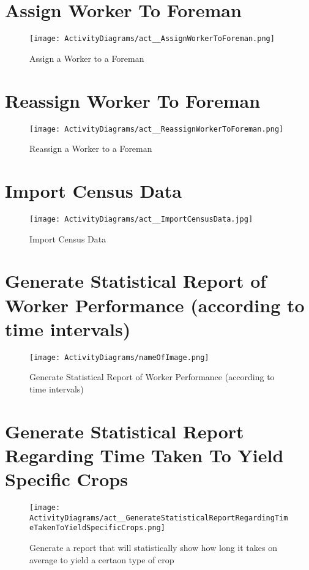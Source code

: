 \documentclass[11pt,fleqn]{book} %
\begin{document}
\section{Assign Worker To Foreman}
\begin{figure}
	\texttt{[image: ActivityDiagrams/act\_\_AssignWorkerToForeman.png]}
	\caption{Assign a Worker to a Foreman}
\end{figure}

\section{Reassign Worker To Foreman}
\begin{figure}
	\texttt{[image: ActivityDiagrams/act\_\_ReassignWorkerToForeman.png]}
	\caption{Reassign a Worker to a Foreman}
\end{figure}

\section{Import Census Data}
\begin{figure}
	\texttt{[image: ActivityDiagrams/act\_\_ImportCensusData.jpg]}
	\caption{Import Census Data}
\end{figure}

\section{Generate Statistical Report of Worker Performance (according to time intervals)}
\begin{figure}
	\texttt{[image: ActivityDiagrams/nameOfImage.png]}
	\caption{Generate Statistical Report of Worker Performance (according to time intervals)}
\end{figure}

\section{Generate Statistical Report Regarding Time Taken To Yield Specific Crops}
\begin{figure}
	\texttt{[image: ActivityDiagrams/act\_\_GenerateStatisticalReportRegardingTimeTakenToYieldSpecificCrops.png]}
	\caption{Generate a report that will statistically show how long it takes on average to yield a certaon type of crop}
\end{figure}

\end{document}
